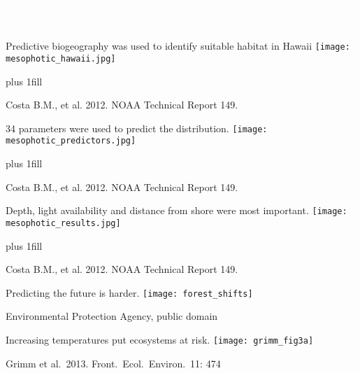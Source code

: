 \documentclass[t]{beamer}
\begin{document}
{
\begin{frame}[b,plain]{\textcolor{white}{Use biogeographic techniques to predict distribution and identify suitable habitat of mesophotic corals.}}
\hfill \textcolor{white}{\textit{Leptoseris} is one genus of mesophotic coral.}
\end{frame}
}

\begin{frame}[t,plain]{Predictive biogeography was used to identify suitable habitat in Hawaii}
	\centering%
		\texttt{[image: mesophotic\_hawaii.jpg]}\par
		
	\vskip0pt plus 1fill
		
\hfill\tiny Costa B.M., et al. 2012. NOAA Technical Report 149.
\end{frame}

\begin{frame}[t,plain]{34 parameters were used to predict the distribution.}
	\centering%
		\texttt{[image: mesophotic\_predictors.jpg]}\par

	\vskip0pt plus 1fill

\hfill\tiny Costa B.M., et al. 2012. NOAA Technical Report 149.
\end{frame}

\begin{frame}[t,plain]{Depth, light availability and distance from shore were most important.}
	\centering%
		\texttt{[image: mesophotic\_results.jpg]}\par

	\vskip0pt plus 1fill

\hfill\tiny Costa B.M., et al. 2012. NOAA Technical Report 149.
\end{frame}

\begin{frame}{Predicting the future is harder.}
\texttt{[image: forest\_shifts]}

\tinyfill Environmental Protection Agency, public domain
\end{frame}

\begin{frame}{Increasing temperatures put ecosystems at risk.}
\texttt{[image: grimm\_fig3a]}

\tinyfill Grimm et al.\ 2013. Front.\ Ecol.\ Environ.\ 11: 474
\end{frame}
\end{document}
